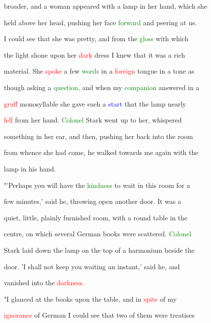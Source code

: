  broader, and a woman appeared with a lamp in her hand, which she

 held above her head, pushing her face \textcolor{green}{forward} and peering at us.

 I could see that she was \textcolor{BurntOrange}{pretty,} and from the \textcolor{green}{gloss} with which

 the light shone upon her \textcolor{red}{dark} dress I knew that it was a rich

 material. She \textcolor{red}{spoke} a few \textcolor{green}{words} in a \textcolor{red}{foreign} tongue in a tone as

 though asking a \textcolor{green}{question,} and when my \textcolor{green}{companion} answered in a

 \textcolor{red}{gruff} monosyllable she gave such a \textcolor{blue}{start} that the lamp nearly

 \textcolor{red}{fell} from her hand. \textcolor{green}{Colonel} \textcolor{BurntOrange}{Stark} went up to her, whispered

 something in her ear, and then, pushing her back into the room

 from whence she had come, he walked towards me again with the

 lamp in his hand.



 "'Perhaps you will have the \textcolor{green}{kindness} to \textcolor{BurntOrange}{wait} in this room for a

 few minutes,' said he, throwing open another door. It was a

 \textcolor{BurntOrange}{quiet,} little, plainly furnished room, with a round table in the

 centre, on which several German books were scattered. \textcolor{green}{Colonel}

 \textcolor{BurntOrange}{Stark} laid down the lamp on the \textcolor{BurntOrange}{top} of a harmonium beside the

 door. 'I shall not keep you \textcolor{BurntOrange}{waiting} an instant,' said he, and

 \textcolor{BurntOrange}{vanished} into the \textcolor{red}{darkness.}



 "I glanced at the books upon the table, and in \textcolor{red}{spite} of my

 \textcolor{red}{ignorance} of German I could see that two of them were treatises

